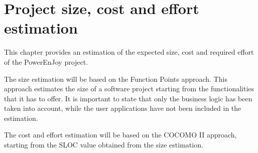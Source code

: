 \chapter{Project size, cost and effort estimation}
This chapter provides an estimation of the expected size, cost and required effort of the PowerEnJoy project.

The size estimation will be based on the Function Points approach. This approach estimates the size of a software project starting from the functionalities that it has to offer. It is important to state that only the business logic has been taken into account, while the user applications have not been included in the estimation.

The cost and effort estimation will be based on the COCOMO II approach, starting from the SLOC value obtained from the size estimation.



